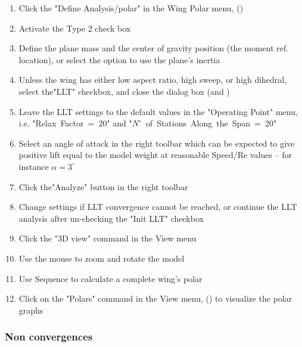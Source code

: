 \documentclass[a4paper,twoside,12pt,dvips]{article}
\begin{document}
\begin{enumerate}
\item Click the "Define Analysis/polar" in the
Wing Polar menu, ()
\item Activate the Type 2 check box
\item Define the plane mass and the center of gravity position (the moment
ref. location), or select the option to use the
plane's inertia
\item Unless the wing has either low aspect ratio, high sweep, or high
dihedral, select the"LLT" checkbox, and
close the dialog box (\Return and \Return)
\item Leave the LLT settings to the default values in the "Operating
Point" menu, i.e. "Relax~Factor~=~20" and
"$N^\circ$~of~Stations~Along~the~Span~=~20"
\item Select an angle of attack in the right toolbar which can be
expected to give positive lift equal to the model weight at reasonable
Speed/Re values -- for instance $\alpha = 3^\circ$
\item Click the"Analyze" button in the right toolbar
\item Change settings if LLT convergence cannot be reached, or
continue the LLT analysis after un-checking the "Init LLT" checkbox
\item Click the "3D view" command in the View menu
\item Use the mouse to zoom and rotate the model
\item Use Sequence to calculate a complete wing's polar
\item Click on the "Polars" command in the View
menu, () to visualize the
polar graphs
\end{enumerate}

\subsubsection{Non convergences}
\end{document}
